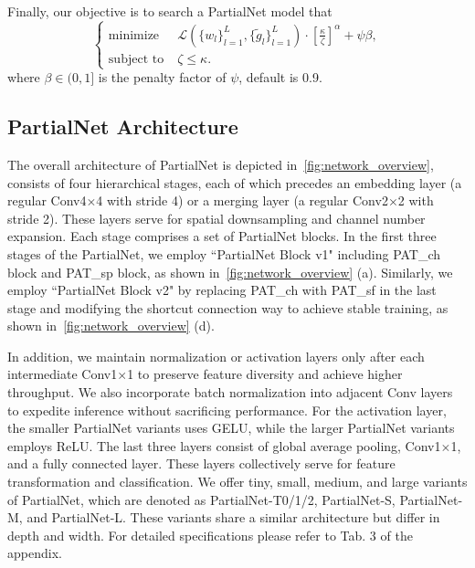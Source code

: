 Finally, our objective is to search a PartialNet model that
{\small
\begin{equation}
  \begin{cases}
    \text{minimize} \; &\mathcal{L}(\{w_l\}_{l=1}^L,\{\widetilde{g}_l\}_{l=1}^L)\cdot [\frac{\kappa}{\zeta}]^\alpha + \psi \beta , \\
    \text{subject to} \; &\zeta \le \kappa.
  \end{cases}
\end{equation} 
}
where {\small $\beta\in (0,1] $} is the penalty factor of {\small $\psi$}, default is 0.9.

\subsection{PartialNet Architecture}
The overall architecture of PartialNet is depicted in~\cref{fig:network_overview}, consists of four hierarchical stages, each of which precedes an embedding layer (a regular Conv4$\times$4 with stride 4) or a merging layer (a regular Conv2$\times$2 with stride 2). These layers serve for spatial downsampling and channel number expansion. Each stage comprises a set of PartialNet blocks. In the first three stages of the PartialNet, we employ ``PartialNet Block v1" including PAT\_ch block and PAT\_sp block, as shown in~\cref{fig:network_overview} (a). Similarly, we employ ``PartialNet Block v2" by replacing PAT\_ch with PAT\_sf in the last stage and modifying the shortcut connection way to achieve stable training, as shown in~\cref{fig:network_overview} (d). 

In addition, we maintain normalization or activation layers only after each intermediate Conv1$\times$1 to preserve feature diversity and achieve higher throughput. We also incorporate batch normalization into adjacent Conv layers to expedite inference without sacrificing performance. For the activation layer, the smaller PartialNet variants uses GELU, while the larger PartialNet variants employs ReLU. The last three layers consist of global average pooling, Conv1$\times$1, and a fully connected layer. These layers collectively serve for feature transformation and classification. We offer tiny, small, medium, and large variants of PartialNet, which are denoted as PartialNet-T0/1/2, PartialNet-S, PartialNet-M, and PartialNet-L. These variants share a similar architecture but differ in depth and width. For detailed specifications please refer to Tab. 3 of the appendix. 

